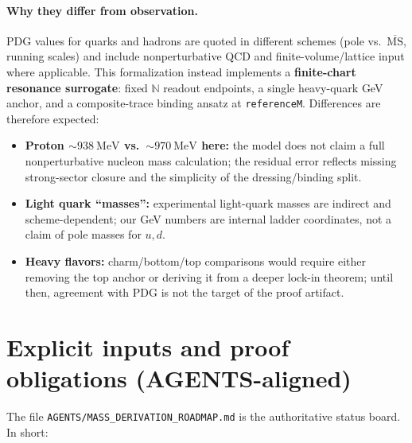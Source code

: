 \documentclass[11pt]{article}
\begin{document}
\paragraph{Why they differ from observation.}
PDG values for quarks and hadrons are quoted in different schemes (pole vs.\ $\overline{\mathrm{MS}}$, running scales) and include nonperturbative QCD and finite-volume/lattice input where applicable. This formalization instead implements a \textbf{finite-chart resonance surrogate}: fixed $\mathbb{N}$ readout endpoints, a single heavy-quark GeV anchor, and a composite-trace binding ansatz at \texttt{referenceM}. Differences are therefore expected:
\begin{itemize}
  \item \textbf{Proton $\sim 938\ \mathrm{MeV}$ vs.\ $\sim 970\ \mathrm{MeV}$ here:} the model does not claim a full nonperturbative nucleon mass calculation; the residual error reflects missing strong-sector closure and the simplicity of the dressing/binding split.
  \item \textbf{Light quark ``masses'':} experimental light-quark masses are indirect and scheme-dependent; our GeV numbers are internal ladder coordinates, not a claim of pole masses for $u,d$.
  \item \textbf{Heavy flavors:} charm/bottom/top comparisons would require either removing the top anchor or deriving it from a deeper lock-in theorem; until then, agreement with PDG is not the target of the proof artifact.
\end{itemize}

\section{Explicit inputs and proof obligations (AGENTS-aligned)}

The file \texttt{AGENTS/MASS\_DERIVATION\_ROADMAP.md} is the authoritative status board. In short:
\end{document}

